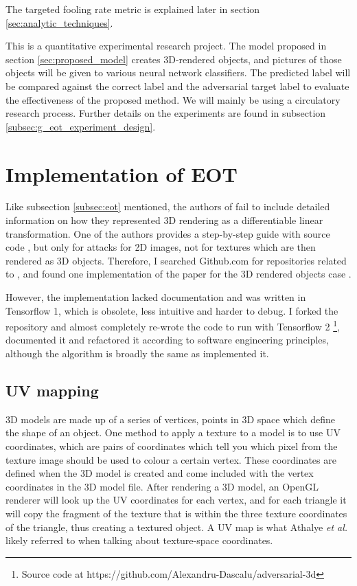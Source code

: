 The targeted fooling rate metric is explained later in section \ref{sec:analytic_techniques}.

This is a quantitative experimental research project. The model proposed in section \ref{sec:proposed_model} creates 3D-rendered objects, and pictures of those objects will be given to various neural network classifiers. The predicted label will be compared against the correct label and the adversarial target label to evaluate the effectiveness of the proposed method. We will mainly be using a circulatory research process. Further details on the experiments are found in subsection \ref{subsec:g_eot_experiment_design}.

\section{Implementation of EOT}
    \label{sec:eot_implementation}

Like subsection \ref{subsec:eot} mentioned, the authors of \cite{athalye} fail to include detailed information on how they represented 3D rendering as a differentiable linear transformation. One of the authors provides a step-by-step guide with source code \cite{athalye_step_by_step}, but only for attacks for 2D images, not for textures which are then rendered as 3D objects. Therefore, I searched Github.com for repositories related to \cite{athalye}, and found one implementation of the paper for the 3D rendered objects case \cite{ring_adversarial_3d}. 

However, the implementation lacked documentation and was written in Tensorflow 1, which is obsolete, less intuitive and harder to debug. I forked the repository and almost completely re-wrote the code to run with Tensorflow 2 \footnote{Source code at https://github.com/Alexandru-Dascalu/adversarial-3d}, documented it and refactored it according to software engineering principles, although the algorithm is broadly the same as \cite{ring_adversarial_3d} implemented it.

\subsection{UV mapping}

3D models are made up of a series of vertices, points in 3D space which define the shape of an object. One method to apply a texture to a model is to use UV coordinates, which are pairs of coordinates which tell you which pixel from the texture image should be used to colour a certain vertex. These coordinates are defined when the 3D model is created and come included with the vertex coordinates in the 3D model file. After rendering a 3D model, an OpenGL renderer will look up the UV coordinates for each vertex, and for each triangle it will copy the fragment of the texture that is within the three texture coordinates of the triangle, thus creating a textured object. A UV map is what Athalye \textit{et al.} \cite{athalye} likely referred to when talking about texture-space coordinates.


